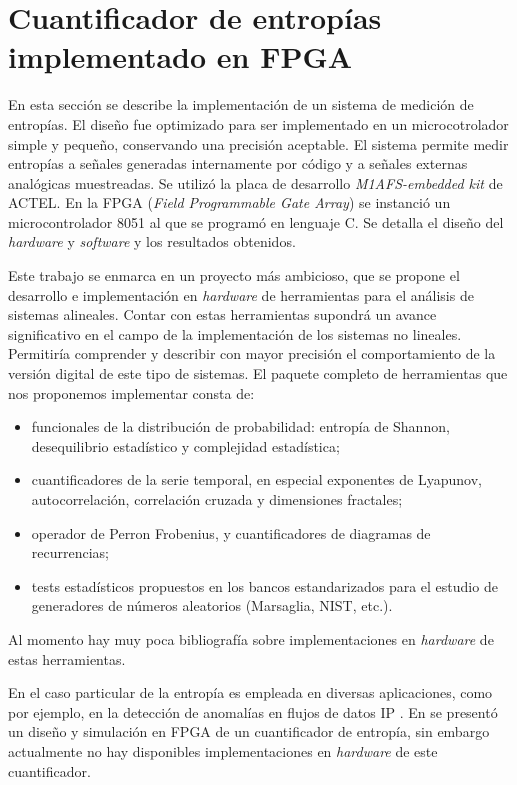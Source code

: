\section{Cuantificador de entropías implementado en FPGA}
\label{sec:ImpFPGA}

En esta sección se describe la implementación de un sistema de medición de entropías.
El diseño fue optimizado para ser implementado en un microcotrolador simple y pequeño, conservando una precisión aceptable.
El sistema permite medir entropías a señales generadas internamente por código y a señales externas analógicas muestreadas.
Se utilizó la placa de desarrollo \textit{M1AFS-embedded kit} de ACTEL.
En la FPGA (\textit{Field Programmable Gate Array}) se instanció un microcontrolador 8051 al que se programó en lenguaje C.
Se detalla el diseño del \textit{hardware} y \textit{software} y los resultados obtenidos.

Este trabajo se enmarca en un proyecto m\'as ambicioso, que se propone el desarrollo e implementación en \textit{hardware} de herramientas para el análisis de sistemas alineales.
Contar con estas herramientas supondr\'a un avance significativo en el campo de la implementación de los sistemas no lineales.
Permitiría comprender y describir con mayor precisión el comportamiento de la versi\'on digital de este tipo de sistemas.
El paquete completo de herramientas que nos proponemos implementar consta de:
\begin{itemize}
	\item funcionales de la distribuci\'on de probabilidad: entrop\'ia de Shannon, desequilibrio estad\'{i}stico y complejidad estad\'{i}stica;
	\item cuantificadores de la serie temporal, en especial exponentes de Lyapunov, autocorrelación, correlación cruzada y dimensiones fractales;
	\item operador de Perron Frobenius, y cuantificadores de diagramas de recurrencias;
	\item tests estad\'isticos propuestos en los bancos estandarizados para el estudio de generadores de números aleatorios (Marsaglia, NIST, etc.).
\end{itemize}

Al momento hay muy poca bibliograf\'ia sobre implementaciones en \textit{hardware} de estas herramientas\cite{DeMicco2013}.

En el caso particular de la entropía es empleada en diversas aplicaciones, como por ejemplo, en la detección de anomalías en flujos de datos IP \cite{Gu2005,Wagner2006}.
En \cite{Subramanya2008} se presentó un diseño y simulación en FPGA de un cuantificador de entropía, sin embargo actualmente no hay disponibles implementaciones en \textit{hardware} de este cuantificador.

